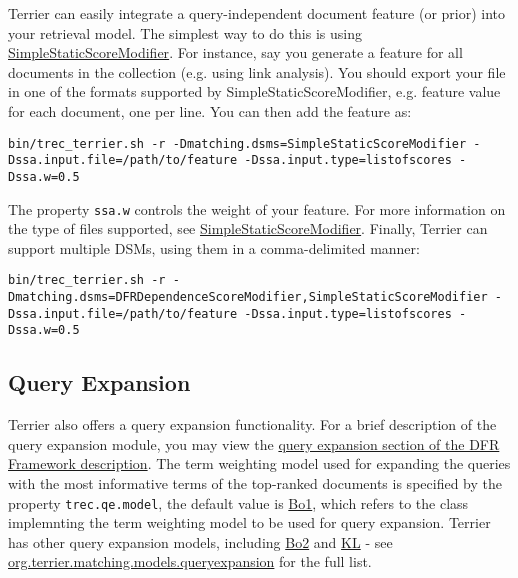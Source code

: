 Terrier can easily integrate a query-independent document feature (or
prior) into your retrieval model. The simplest way to do this is using
\href{javadoc/org/terrier/matching/dsms/SimpleStaticScoreModifier.html}{SimpleStaticScoreModifier}.
For instance, say you generate a feature for all documents in the
collection (e.g. using link analysis). You should export your file in
one of the formats supported by SimpleStaticScoreModifier, e.g. feature
value for each document, one per line. You can then add the feature as:

\begin{verbatim}
bin/trec_terrier.sh -r -Dmatching.dsms=SimpleStaticScoreModifier -Dssa.input.file=/path/to/feature -Dssa.input.type=listofscores -Dssa.w=0.5
\end{verbatim}

The property \texttt{ssa.w} controls the weight of your feature. For
more information on the type of files supported, see
\href{javadoc/org/terrier/matching/dsms/SimpleStaticScoreModifier.html}{SimpleStaticScoreModifier}.
Finally, Terrier can support multiple DSMs, using them in a
comma-delimited manner:

\begin{verbatim}
bin/trec_terrier.sh -r -Dmatching.dsms=DFRDependenceScoreModifier,SimpleStaticScoreModifier -Dssa.input.file=/path/to/feature -Dssa.input.type=listofscores -Dssa.w=0.5
\end{verbatim}

\href{}{}

\subsection{Query Expansion}\label{query-expansion}

Terrier also offers a query expansion functionality. For a brief
description of the query expansion module, you may view the
\href{dfr_description.html\#queryexpansion}{query expansion section of
the DFR Framework description}. The term weighting model used for
expanding the queries with the most informative terms of the top-ranked
documents is specified by the property \texttt{trec.qe.model}, the
default value is
\href{javadoc/org/terrier/matching/models/queryexpansion/Bo1.html}{Bo1},
which refers to the class implemnting the term weighting model to be
used for query expansion. Terrier has other query expansion models,
including
\href{javadoc/org/terrier/matching/models/queryexpansion/Bo2.html}{Bo2}
and
\href{javadoc/org/terrier/matching/models/queryexpansion/KL.html}{KL} -
see
\href{javadoc/org/terrier/matching/models/queryexpansion/package-summary.html}{org.terrier.matching.models.queryexpansion}
for the full list.

